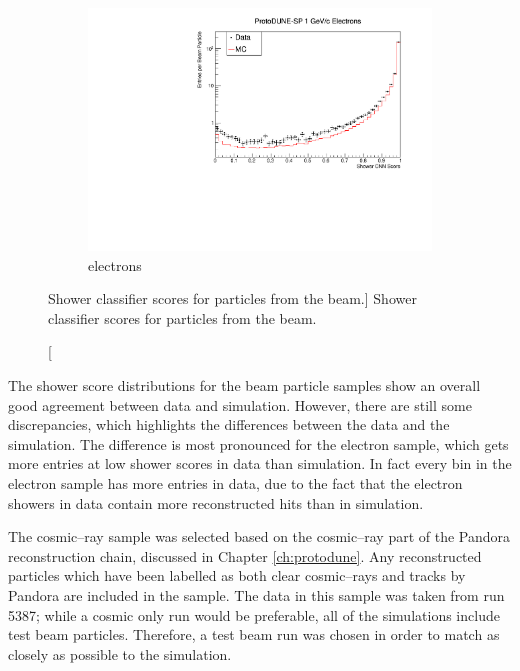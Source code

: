 \begin{figure}
	\begin{subfigure}[b]{0.7\textwidth}
		\centering
		\includegraphics[width=\textwidth]{figures/hit_cnn_electron.pdf}
		\caption {electrons}
		\label{fig:beam_electron_cnn}
	\end{subfigure}

	\caption
	[Shower classifier scores for particles from the \protodune{} beam.]
	{Shower classifier scores for particles from the \protodune{} beam.}

	\label{fig:cnn_scores_beam}

\end{figure}

The shower score distributions for the beam particle samples show an overall
good agreement between data and simulation. However, there are still some
discrepancies, which highlights the differences between the data and the
simulation. The difference is most pronounced for the electron sample, which
gets more entries at low shower scores in data than simulation. In fact every
bin in the electron sample has more entries in data, due to the fact that the
electron showers in data contain more reconstructed hits than in simulation. 

The cosmic--ray sample was selected based on the cosmic--ray part of the
Pandora reconstruction chain, discussed in Chapter \ref{ch:protodune}. Any
reconstructed particles which have been labelled as both clear cosmic--rays
and tracks by Pandora are included in the sample. The data in this sample was
taken from run 5387; while a cosmic only run would be preferable, all of the
\protodune{} simulations include test beam particles. Therefore, a test beam
run was chosen in order to match as closely as possible to the simulation.

